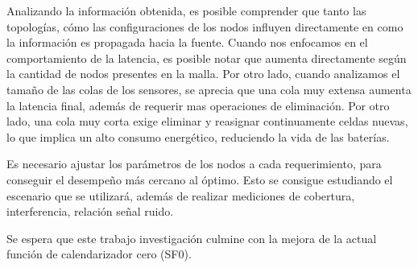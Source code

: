 Analizando la información obtenida, es posible comprender que tanto las topologías, cómo las configuraciones de los nodos influyen directamente en como la información es propagada hacia la fuente. Cuando nos enfocamos en el comportamiento de la latencia, es posible notar que aumenta directamente según la cantidad de nodos presentes en la malla. Por otro lado, cuando analizamos el tamaño de las colas de los sensores, se aprecia que una cola muy extensa aumenta la latencia final, además de requerir mas operaciones de eliminación. Por otro lado, una cola muy corta exige eliminar y reasignar continuamente celdas nuevas, lo que implica un alto consumo energético, reduciendo la vida de las baterías.

Es necesario ajustar los parámetros de los nodos a cada requerimiento, para conseguir el desempeño más cercano al óptimo. Esto se consigue estudiando el escenario que se utilizará, además de realizar mediciones de cobertura, interferencia, relación señal ruido.

Se espera que este trabajo investigación culmine con la mejora de la actual función de calendarizador cero (SF0).